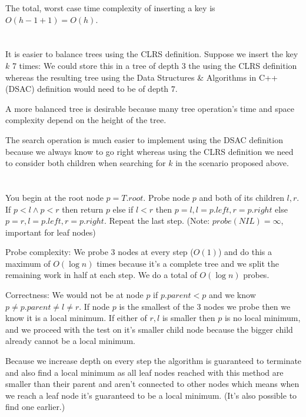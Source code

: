 \documentclass[12pt, a4paper]{article}
\begin{document}
The total, worst case time complexity of inserting a key is $O(h - 1 + 1) = O(h)$.

\section{} %
It is easier to balance trees using the CLRS definition. Suppose we insert the key $k$ 7 times: We could store this in a tree of depth $3$ the using the CLRS definition whereas the resulting tree using the Data Structures \& Algorithms in C++ (DSAC) definition would need to be of depth $7$.

A more balanced tree is desirable because many tree operation's time and space complexity depend on the height of the tree.

The search operation is much easier to implement using the DSAC definition because we always know to go right whereas using the CLRS definition we need to consider both children when searching for $k$ in the scenario proposed above.

\section{} %
You begin at the root node $p = T.root$. Probe node $p$ and both of its children $l, r$. If $p < l \land p < r$ then return $p$ else if $l < r$ then $p = l, l = p.left, r = p.right$ else $p = r, l = p.left, r = p.right$. Repeat the last step. (Note: $probe(NIL) = \infty$, important for leaf nodes)

Probe complexity: We probe $3$ nodes at every step ($O(1)$) and do this a maximum of $O(\log n)$ times because it's a complete tree and we split the remaining work in half at each step. We do a total of $O(\log n)$ probes.

Correctness:
We would not be at node $p$ if $p.parent < p$ and we know $p \neq p.parent \neq l \neq r$. If node $p$ is the smallest of the $3$ nodes we probe then we know it is a local minimum. If either of $r, l$ is smaller then $p$ is no local minimum, and we proceed with the test on it's smaller child node because the bigger child already cannot be a local minimum.

Because we increase depth on every step the algorithm is guaranteed to terminate and also find a local minimum as all leaf nodes reached with this method are smaller than their parent and aren't connected to other nodes which means when we reach a leaf node it's guaranteed to be a local minimum. (It's also possible to find one earlier.)
\end{document}
